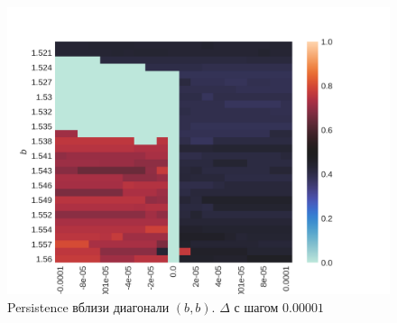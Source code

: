 \documentclass[12pt]{article}
\begin{document}
    \begin{figure}[H]
         \centering
         \includegraphics[width=0.95\columnwidth, keepaspectratio=True]{DoubleField/persistence_chaos_small.png}
         \caption{Persistence вблизи диагонали $(b, b)$. $\Delta$ с шагом $0.00001$}
         \label{fig:chaos_pers_small}
    \end{figure}
\end{document}
